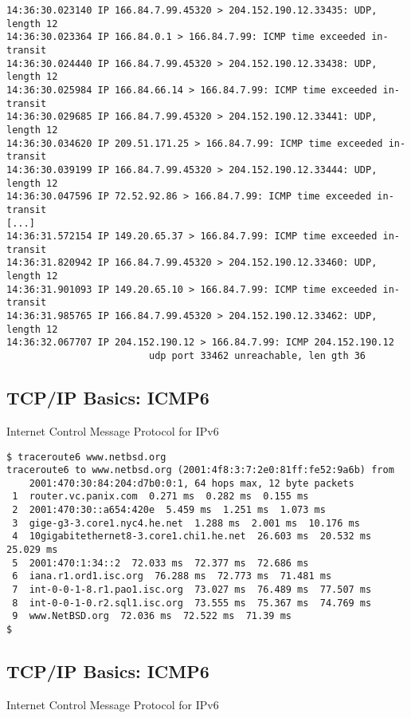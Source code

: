 \documentclass[xga]{xdvislides}
\begin{document}
\begin{verbatim}
14:36:30.023140 IP 166.84.7.99.45320 > 204.152.190.12.33435: UDP, length 12
14:36:30.023364 IP 166.84.0.1 > 166.84.7.99: ICMP time exceeded in-transit
14:36:30.024440 IP 166.84.7.99.45320 > 204.152.190.12.33438: UDP, length 12
14:36:30.025984 IP 166.84.66.14 > 166.84.7.99: ICMP time exceeded in-transit
14:36:30.029685 IP 166.84.7.99.45320 > 204.152.190.12.33441: UDP, length 12
14:36:30.034620 IP 209.51.171.25 > 166.84.7.99: ICMP time exceeded in-transit
14:36:30.039199 IP 166.84.7.99.45320 > 204.152.190.12.33444: UDP, length 12
14:36:30.047596 IP 72.52.92.86 > 166.84.7.99: ICMP time exceeded in-transit
[...]
14:36:31.572154 IP 149.20.65.37 > 166.84.7.99: ICMP time exceeded in-transit
14:36:31.820942 IP 166.84.7.99.45320 > 204.152.190.12.33460: UDP, length 12
14:36:31.901093 IP 149.20.65.10 > 166.84.7.99: ICMP time exceeded in-transit
14:36:31.985765 IP 166.84.7.99.45320 > 204.152.190.12.33462: UDP, length 12
14:36:32.067707 IP 204.152.190.12 > 166.84.7.99: ICMP 204.152.190.12
                         udp port 33462 unreachable, len gth 36
\end{verbatim}


\subsection{TCP/IP Basics: ICMP6}
\begin{center}
Internet Control Message Protocol for IPv6
\end{center}
\vspace{.2in}

\begin{verbatim}
$ traceroute6 www.netbsd.org
traceroute6 to www.netbsd.org (2001:4f8:3:7:2e0:81ff:fe52:9a6b) from
    2001:470:30:84:204:d7b0:0:1, 64 hops max, 12 byte packets
 1  router.vc.panix.com  0.271 ms  0.282 ms  0.155 ms
 2  2001:470:30::a654:420e  5.459 ms  1.251 ms  1.073 ms
 3  gige-g3-3.core1.nyc4.he.net  1.288 ms  2.001 ms  10.176 ms
 4  10gigabitethernet8-3.core1.chi1.he.net  26.603 ms  20.532 ms  25.029 ms
 5  2001:470:1:34::2  72.033 ms  72.377 ms  72.686 ms
 6  iana.r1.ord1.isc.org  76.288 ms  72.773 ms  71.481 ms
 7  int-0-0-1-8.r1.pao1.isc.org  73.027 ms  76.489 ms  77.507 ms
 8  int-0-0-1-0.r2.sql1.isc.org  73.555 ms  75.367 ms  74.769 ms
 9  www.NetBSD.org  72.036 ms  72.522 ms  71.39 ms
$
\end{verbatim}

\subsection{TCP/IP Basics: ICMP6}
\begin{center}
Internet Control Message Protocol for IPv6
\end{center}
\end{document}
